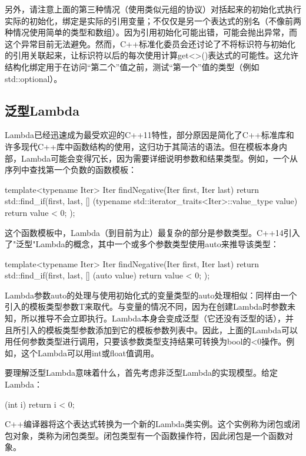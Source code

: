 另外，请注意上面的第三种情况（使用类似元组的协议）对括起来的初始化式执行实际的初始化，绑定是实际的引用变量；不仅仅是另一个表达式的别名（不像前两种情况使用简单的类型和数组）。因为引用初始化可能出错，可能会抛出异常，而这个异常目前无法避免。然而，C++标准化委员会还讨论了不将标识符与初始化的引用关联起来，让标识符以后的每次使用计算get<>()表达式的可能性。这允许结构化绑定用于在访问“第二个”值之前，测试“第一个”值的类型（例如std::optional）。

\subsection{泛型Lambda}

Lambda已经迅速成为最受欢迎的C++11特性，部分原因是简化了C++标准库和许多现代C++库中函数结构的使用，这归功于其简洁的语法。但在模板本身内部，Lambda可能会变得冗长，因为需要详细说明参数和结果类型。例如，一个从序列中查找第一个负数的函数模板：

\begin{cpp}
template<typename Iter>
Iter findNegative(Iter first, Iter last) {
	return std::find_if(first, last,
						[] (typename std::iterator_traits<Iter>::value_type
						value) {
							return value < 0;
						});
}
\end{cpp}

这个函数模板中，Lambda（到目前为止）最复杂的部分是参数类型。C++14引入了"泛型"Lambda的概念，其中一个或多个参数类型使用auto来推导该类型：

\begin{cpp}
template<typename Iter>
Iter findNegative(Iter first, Iter last) {
	return std::find_if(first, last,
						[] (auto value) {
							return value < 0;
						});
}
\end{cpp}

Lambda参数auto的处理与使用初始化式的变量类型的auto处理相似：同样由一个引入的模板类型参数T来取代。与变量的情况不同，因为在创建Lambda时参数未知，所以推导不会立即执行。Lambda本身会变成泛型（它还没有泛型的话），并且所引入的模板类型参数添加到它的模板参数列表中。因此，上面的Lambda可以用任何参数类型进行调用，只要该参数类型支持结果可转换为bool的<0操作。例如，这个Lambda可以用int或float值调用。

要理解泛型Lambda意味着什么，首先考虑非泛型Lambda的实现模型。给定Lambda：

\begin{cpp}
[] (int i) {
	return i < 0;
}
\end{cpp}

C++编译器将这个表达式转换为一个新的Lambda类实例。这个实例称为闭包或闭包对象，类称为闭包类型。闭包类型有一个函数操作符，因此闭包是一个函数对象。

